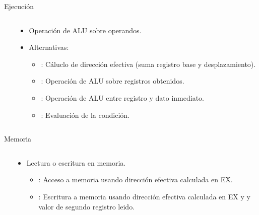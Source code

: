 \begin{frame}[t]{Ejecución}
\begin{columns}
\begin{column}{.3\textwidth}

\end{column}
\begin{column}{.7\textwidth}
\begin{itemize}
  \item Operación de ALU sobre operandos.
  \item Alternativas:
    \begin{itemize}
      \item {}:
            Cáluclo de dirección efectiva (suma registro base y desplazamiento).
      \item {}:
            Operación de ALU sobre registros obtenidos.
      \item {}:
            Operación de ALU entre registro y dato inmediato.
      \item {}:
            Evaluación de la condición.
    \end{itemize}
\end{itemize}
\end{column}
\end{columns}
\end{frame}

\begin{frame}[t]{Memoria}
\begin{columns}
\begin{column}{.3\textwidth}
\begin{center}

\end{center}
\end{column}
\begin{column}{.7\textwidth}
\begin{itemize}
  \item Lectura o escritura en memoria.
    \begin{itemize}
      \item {}:
            Acceso a memoria usando dirección efectiva calculada en EX.
      \item {}:
            Escritura a memoria usando dirección efectiva calculada en EX y
            y valor de segundo registro leido.
    \end{itemize}
\end{itemize}
\end{column}
\end{columns}
\end{frame}

